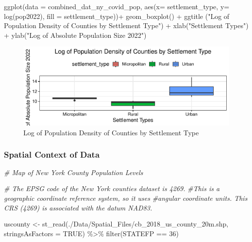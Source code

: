 \documentclass[
  12pt,
]{article}
\newenvironment{Shaded}{\begin{snugshade}}{\end{snugshade}}
\newcommand{\AttributeTok}[1]{\textcolor[rgb]{0.77,0.63,0.00}{#1}}
\newcommand{\CommentTok}[1]{\textcolor[rgb]{0.56,0.35,0.01}{\textit{#1}}}
\newcommand{\ConstantTok}[1]{\textcolor[rgb]{0.00,0.00,0.00}{#1}}
\newcommand{\DecValTok}[1]{\textcolor[rgb]{0.00,0.00,0.81}{#1}}
\newcommand{\FunctionTok}[1]{\textcolor[rgb]{0.00,0.00,0.00}{#1}}
\newcommand{\NormalTok}[1]{#1}
\newcommand{\OtherTok}[1]{\textcolor[rgb]{0.56,0.35,0.01}{#1}}
\newcommand{\SpecialCharTok}[1]{\textcolor[rgb]{0.00,0.00,0.00}{#1}}
\newcommand{\StringTok}[1]{\textcolor[rgb]{0.31,0.60,0.02}{#1}}
\begin{document}
\begin{Shaded}
\begin{Highlighting}[]
\FunctionTok{ggplot}\NormalTok{(}\AttributeTok{data =}\NormalTok{ combined\_dat\_ny\_covid\_pop,}
       \FunctionTok{aes}\NormalTok{(}\AttributeTok{x=}\NormalTok{ settlement\_type, }\AttributeTok{y=} \FunctionTok{log}\NormalTok{(pop2022), }\AttributeTok{fill =}\NormalTok{ settlement\_type))}\SpecialCharTok{+}
  \FunctionTok{geom\_boxplot}\NormalTok{() }\SpecialCharTok{+}
    \FunctionTok{ggtitle}\NormalTok{ (}\StringTok{"Log of Population Density of Counties by Settlement Type"}\NormalTok{) }\SpecialCharTok{+}
  \FunctionTok{xlab}\NormalTok{(}\StringTok{"Settlement Types"}\NormalTok{) }\SpecialCharTok{+}
  \FunctionTok{ylab}\NormalTok{(}\StringTok{"Log of Absolute Population Size 2022"}\NormalTok{)}
\end{Highlighting}
\end{Shaded}

\begin{figure}

{\centering \includegraphics{EDA_Final_Group_Project_files/figure-latex/unnamed-chunk-13-1} 

}

\caption{Log of Population Density of Counties by Settlement Type}\label{fig:unnamed-chunk-13}
\end{figure}

\hypertarget{spatial-context-of-data}{%
\subsubsection{Spatial Context of Data}\label{spatial-context-of-data}}

\begin{Shaded}
\begin{Highlighting}[]
\CommentTok{\# Map of New York County Population Levels}
 
\CommentTok{\# The EPSG code of the New York counties dataset is 4269.}
\CommentTok{\#This is a geographic coordinate reference system, so it uses}
\CommentTok{\#angular coordinate units. This CRS (4269) is associated with the datum NAD83.}

\NormalTok{uscounty }\OtherTok{\textless{}{-}} \FunctionTok{st\_read}\NormalTok{(}\StringTok{\textquotesingle{}./Data/Spatial\_Files/cb\_2018\_us\_county\_20m.shp\textquotesingle{}}\NormalTok{,}
                    \AttributeTok{stringsAsFactors =} \ConstantTok{TRUE}\NormalTok{) }\SpecialCharTok{\%\textgreater{}\%}
 \FunctionTok{filter}\NormalTok{(STATEFP }\SpecialCharTok{==} \DecValTok{36}\NormalTok{)}
\end{Highlighting}
\end{Shaded}
\end{document}
